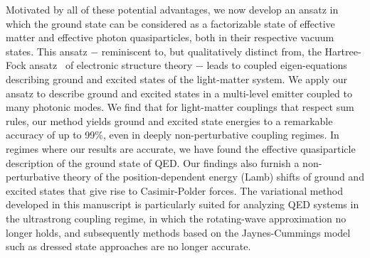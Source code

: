 \documentclass[aps,prl,twocolumn,
	groupedaddress,superscriptaddress,
	amsfonts,amssymb,amsmath,floatfix,
	citeautoscript]{revtex4-1}
\newcommand{\Jadd}[1]{\textcolor{blue}{#1}}
\begin{document}
Motivated by all of these potential advantages, we now develop an ansatz in which the ground state can be considered as a factorizable state of effective matter and effective photon quasiparticles, both in their respective vacuum states. This ansatz $-$ reminiscent to, but qualitatively distinct from, the Hartree-Fock ansatz~\cite{szabo1989} of electronic structure theory $-$ leads to coupled eigen-equations describing ground and excited states of the light-matter system. We apply our ansatz to describe ground and excited states in a multi-level emitter coupled to many photonic modes. We find that for light-matter couplings that respect sum rules, our method yields ground and excited state energies to a remarkable accuracy of up to 99\%, even in deeply non-perturbative coupling regimes.  In regimes where our results are accurate, we have found the effective quasiparticle description of the ground state of QED.  Our findings also furnish a non-perturbative theory of the position-dependent energy (Lamb) shifts of ground and excited states that give rise to Casimir-Polder forces. The variational method developed in this manuscript is particularly suited for analyzing QED systems in the ultrastrong coupling regime, in which the rotating-wave approximation no longer holds, and subsequently methods based on the Jaynes-Cummings model such as dressed state approaches \cite{cohen1992} are no longer accurate. %



\end{document}
